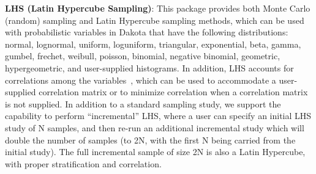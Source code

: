 


\textbf{LHS (Latin Hypercube Sampling)}: This package provides both
Monte Carlo (random) sampling and Latin Hypercube sampling methods,
which can be used with probabilistic variables in Dakota that have the
following distributions: normal, lognormal, uniform, loguniform,
triangular, exponential, beta, gamma, gumbel, frechet, weibull, poisson, 
binomial, negative binomial, geometric, hypergeometric, and
user-supplied histograms. In addition, LHS accounts for correlations
among the variables~\cite{Ima84}, which can be used to accommodate a
user-supplied correlation matrix or to minimize correlation when a
correlation matrix is not supplied. 
In addition to a standard sampling study, we support the capability to perform 
``incremental'' LHS, where a user can specify an initial LHS study 
of N samples, and then re-run an additional incremental study which 
will double the number of samples (to 2N, with the first N being 
carried from the initial study). The full incremental sample of 
size 2N is also a Latin Hypercube, with proper stratification and 
correlation. 

